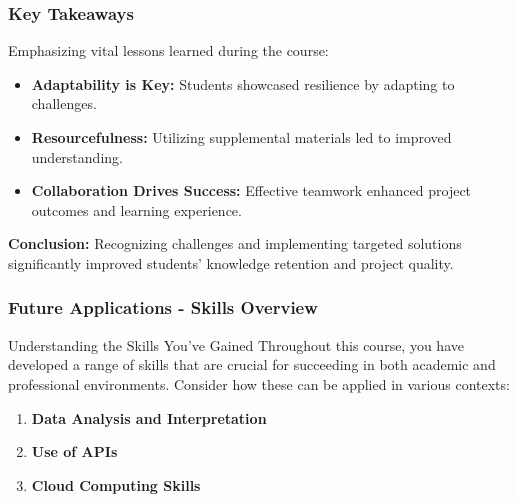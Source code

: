 \documentclass[aspectratio=169]{beamer}
\begin{document}
\begin{frame}
    \frametitle{Key Takeaways}
    Emphasizing vital lessons learned during the course:
    
    \begin{itemize}
        \item \textbf{Adaptability is Key:} Students showcased resilience by adapting to challenges.
        \item \textbf{Resourcefulness:} Utilizing supplemental materials led to improved understanding.
        \item \textbf{Collaboration Drives Success:} Effective teamwork enhanced project outcomes and learning experience.
    \end{itemize}
    
    \textbf{Conclusion:} Recognizing challenges and implementing targeted solutions significantly improved students' knowledge retention and project quality.
\end{frame}

\begin{frame}[fragile]
    \frametitle{Future Applications - Skills Overview}
    \begin{block}{Understanding the Skills You’ve Gained}
        Throughout this course, you have developed a range of skills that are crucial for succeeding in both academic and professional environments. Consider how these can be applied in various contexts:
    \end{block}
    
    \begin{enumerate}
        \item \textbf{Data Analysis and Interpretation}
        \item \textbf{Use of APIs}
        \item \textbf{Cloud Computing Skills}
    \end{enumerate}
\end{frame}
\end{document}
